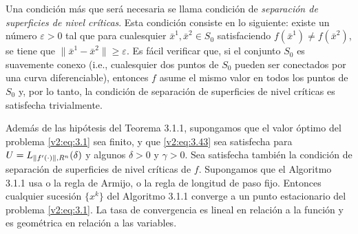 Una condición más que será necesaria se llama condición de \textit{separación de superficies de nivel críticas}. Esta condición consiste en lo siguiente: existe un número $\varepsilon > 0$ tal que para cualesquier $\bar{x}^1, \bar{x}^2 \in S_0$ satisfaciendo $f(\bar{x}^1) \neq f(\bar{x}^2)$, se tiene que $\|\bar{x}^1 - \bar{x}^2\| \ge \varepsilon$.
Es fácil verificar que, si el conjunto $S_0$ es suavemente conexo (i.e., cualesquier dos puntos de $S_0$ pueden ser conectados por una curva diferenciable), entonces $f$ asume el mismo valor en todos los puntos de $S_0$ y, por lo tanto, la condición de separación de superficies de nivel críticas es satisfecha trivialmente.


\begin{theorem}\label{v2:thm:3.1.5}
    Además de las hipótesis del Teorema 3.1.1, supongamos que el valor óptimo del problema \eqref{v2:eq:3.1} sea finito, y que \eqref{v2:eq:3.43} sea satisfecha para $U = L_{\|f'(\cdot)\|, R^n}(\delta)$ y algunos $\delta > 0$ y $\gamma > 0$. Sea satisfecha también la condición de separación de superficies de nivel críticas de $f$. Supongamos que el Algoritmo 3.1.1 usa o la regla de Armijo, o la regla de longitud de paso fijo.
    Entonces cualquier sucesión $\{x^k\}$ del Algoritmo 3.1.1 converge a un punto estacionario del problema \eqref{v2:eq:3.1}. La tasa de convergencia es lineal en relación a la función y es geométrica en relación a las variables.
\end{theorem}
